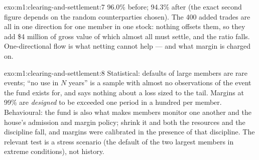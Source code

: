 \begin{solution}{exo:m1:clearing-and-settlement:7}
96.0\% before; 94.3\% after (the exact second figure depends on the random
counterparties chosen). The 400 added trades are all in one direction for one
member in one stock: nothing offsets them, so they add \$4 million of gross
value of which almost all must settle, and the ratio falls. One-directional
flow is what netting cannot help --- and what margin is charged on.
\end{solution}

\begin{solution}{exo:m1:clearing-and-settlement:8}
Statistical: defaults of large members are rare events; ``no use in $N$
years'' is a sample with almost no observations of the event the fund exists
for, and says nothing about a loss sized to the tail. Margins at 99\% are
\emph{designed} to be exceeded one period in a hundred per member.
Behavioural: the fund is also what makes members monitor one another and the
 house's admission and margin policy; shrink it and both the
resources and the discipline fall, and margins were calibrated in the
presence of that discipline. The relevant test is a stress scenario (the
default of the two largest members in extreme conditions), not history.
\end{solution}


